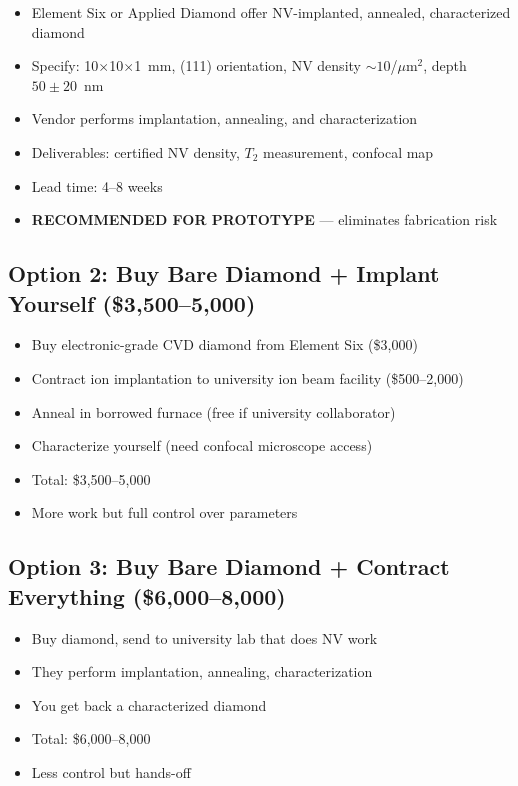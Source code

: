 \documentclass[11pt,a4paper,openany]{book}
\begin{document}
\begin{itemize}[nosep]
  \item Element Six or Applied Diamond offer NV-implanted, annealed, characterized diamond
  \item Specify: 10$\times$10$\times$1~mm, (111) orientation, NV density ${\sim}10$/$\mu$m$^2$, depth $50 \pm 20$~nm
  \item Vendor performs implantation, annealing, and characterization
  \item Deliverables: certified NV density, $T_2$ measurement, confocal map
  \item Lead time: 4--8 weeks
  \item \textbf{RECOMMENDED FOR PROTOTYPE} --- eliminates fabrication risk
\end{itemize}

\subsection{Option 2: Buy Bare Diamond + Implant Yourself (\$3,500--5,000)}

\begin{itemize}[nosep]
  \item Buy electronic-grade CVD diamond from Element Six (\$3,000)
  \item Contract ion implantation to university ion beam facility (\$500--2,000)
  \item Anneal in borrowed furnace (free if university collaborator)
  \item Characterize yourself (need confocal microscope access)
  \item Total: \$3,500--5,000
  \item More work but full control over parameters
\end{itemize}

\subsection{Option 3: Buy Bare Diamond + Contract Everything (\$6,000--8,000)}

\begin{itemize}[nosep]
  \item Buy diamond, send to university lab that does NV work
  \item They perform implantation, annealing, characterization
  \item You get back a characterized diamond
  \item Total: \$6,000--8,000
  \item Less control but hands-off
\end{itemize}
\end{document}
